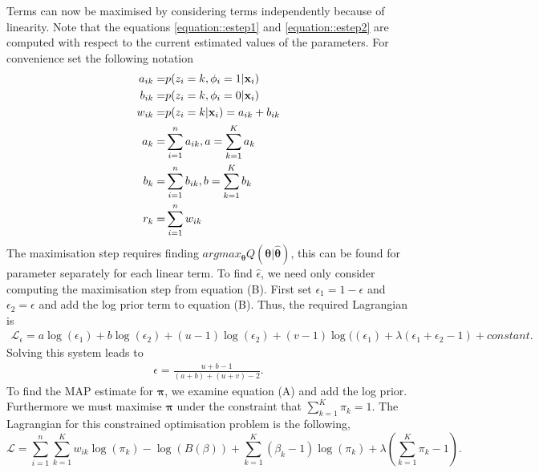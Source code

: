 \documentclass[12pt,english]{article}\usepackage[]{graphicx}\usepackage[]{color}
\begin{document}
Terms can now be maximised by considering terms independently because of linearity. Note that the equations \ref{equation::estep1} and \ref{equation::estep2} are computed with respect to the current estimated values of the parameters. For convenience set the following notation
\begin{equation}\label{equation::estepfinalapp}
\begin{split}
a_{ik} = & p(z_i = k, \phi_i = 1|{\bf x}_i)\\
b_{ik} = & p(z_i = k, \phi_i = 0|{\bf x}_i) \\
w_{ik} = & p(z_i = k|{\bf x}_i) = a_{ik} + b_{ik}\\
a_k = & \sum_{i=1}^{n}a_{ik}, a = \sum_{k=1}^{K}a_k \\
b_k = & \sum_{i=1}^{n}b_{ik}, b = \sum_{k=1}^{K}b_k \\
r_k = & \sum_{i=1}^{n}w_{ik}
\end{split}
\end{equation}
The maximisation step requires finding $argmax_{\boldsymbol{\theta}}Q(\boldsymbol{\theta}|\boldsymbol{\hat{\theta}})$, this can be found for parameter separately for each linear term. To find $\hat{\epsilon}$, we need only consider computing the maximisation step from equation (B). First set $\epsilon_1 = 1 - \epsilon$ and $\epsilon_2 = \epsilon$ and add the log prior term to equation (B). Thus, the required Lagrangian is
\begin{equation}
\begin{split}
\mathcal{L}_{\epsilon} = a\log(\epsilon_1) + b\log(\epsilon_2) + (u-1)\log(\epsilon_2) + (v-1)\log((\epsilon_1) + \lambda(\epsilon_1 + \epsilon_2 - 1) +  constant.
\end{split}
\end{equation}
Solving this system leads to
\begin{equation}
\begin{split}
\epsilon = \frac{ u + b - 1}{(a+b) + (u+v) - 2}.
\end{split}
\end{equation}
To find the MAP estimate for $\boldsymbol{\pi}$, we examine equation (A) and add the log prior.
Furthermore we must maximise $\boldsymbol{\pi}$ under the constraint that $\sum_{k=1}^{K}\pi_k = 1$. The Lagrangian for this constrained optimisation problem is the following,
\begin{equation}
\mathcal{L}= \sum_{i=1}^{n}\sum_{k=1}^{K}w_{ik}\log(\pi_k) - \log(B(\beta)) + \sum_{k=1}^{K}(\beta_k - 1)\log(\pi_k) + \lambda\left(\sum_{k=1}^{K}\pi_k-1\right).
\end{equation}
\end{document}
